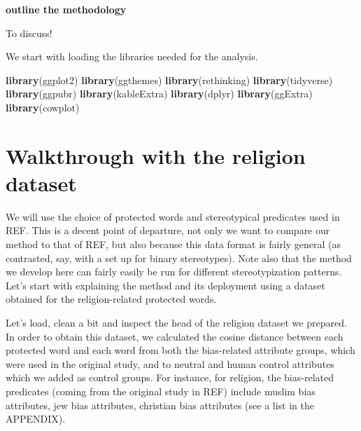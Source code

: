 \documentclass[12pt,]{book}
\newenvironment{Shaded}{\begin{snugshade}}{\end{snugshade}}
\newcommand{\KeywordTok}[1]{\textcolor[rgb]{0.13,0.29,0.53}{\textbf{#1}}}
\newcommand{\NormalTok}[1]{#1}
\begin{document}
\textbf{outline the methodology}

To discuss!

We start with loading the libraries needed for the analysis.

\footnotesize

\begin{Shaded}
\begin{Highlighting}[]
\KeywordTok{library}\NormalTok{(ggplot2)}
\KeywordTok{library}\NormalTok{(ggthemes)}
\KeywordTok{library}\NormalTok{(rethinking)}
\KeywordTok{library}\NormalTok{(tidyverse)}
\KeywordTok{library}\NormalTok{(ggpubr)}
\KeywordTok{library}\NormalTok{(kableExtra)}
\KeywordTok{library}\NormalTok{(dplyr)}
\KeywordTok{library}\NormalTok{(ggExtra)}
\KeywordTok{library}\NormalTok{(cowplot)}
\end{Highlighting}
\end{Shaded}

\normalsize 

\chapter{Walkthrough with the religion
dataset}\label{walkthrough-with-the-religion-dataset}

We will use the choice of protected words and stereotypical predicates
used in REF. This is a decent point of departure, not only we want to
compare our method to that of REF, but also because this data format is
fairly general (as contrasted, say, with a set up for binary
stereotypes). Note also that the method we develop here can fairly
easily be run for different stereotypization patterns. Let's start with
explaining the method and its deployment using a dataset obtained for
the religion-related protected words.

Let's load, clean a bit and inspect the head of the religion dataset we
prepared. In order to obtain this dataset, we calculated the cosine
distance between each protected word and each word from both the
bias-related attribute groups, which were used in the original study,
and to neutral and human control attributes which we added as control
groups. For instance, for religion, the bias-related predicates (coming
from the original study in REF) include muslim bias attributes, jew bias
attributes, christian bias attributes (see a list in the APPENDIX).
\end{document}
